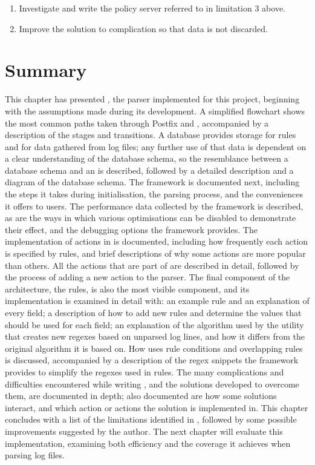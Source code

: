 \begin{enumerate}

    \item Investigate and write the policy server referred to in limitation
        3 above.

    \item Improve the solution to complication  so that data is not discarded.

\end{enumerate}


\section{Summary}

This chapter has presented \parsername{}, the parser implemented for this
project, beginning with the assumptions made during its development.  A
simplified flowchart shows the most common paths taken through Postfix and
\parsername{}, accompanied by a description of the stages and transitions.
A database provides storage for rules and for data gathered from log files;
any further use of that data is dependent on a clear understanding of the
database schema, so the resemblance between a database schema and an
 is described, followed by a detailed description and a
diagram of the database schema.  The framework is documented next,
including the steps it takes during initialisation, the parsing process,
and the conveniences it offers to users.  The performance data collected by
the framework is described, as are the ways in which various optimisations
can be disabled to demonstrate their effect, and the debugging options the
framework provides.  The implementation of actions in \parsername{} is
documented, including how frequently each action is specified by rules, and
brief descriptions of why some actions are more popular than others.  All
the actions that are part of \parsername{} are described in detail,
followed by the process of adding a new action to the parser.  The final
component of the architecture, the rules, is also the most visible
component, and its implementation is examined in detail with: an example
rule and an explanation of every field; a description of how to add new
rules and determine the values that should be used for each field; an
explanation of the algorithm used by the utility that creates new regexes
based on unparsed log lines, and how it differs from the original algorithm
it is based on.  How \parsername{} uses rule conditions and overlapping
rules is discussed, accompanied by a description of the regex snippets the
framework provides to simplify the regexes used in rules.  The many
complications and difficulties encountered while writing \parsername{}, and
the solutions developed to overcome them, are documented in depth; also
documented are how some solutions interact, and which action or actions the
solution is implemented in.  This chapter concludes with a list of the
limitations identified in \parsername{}, followed by some possible
improvements suggested by the author.  The next chapter will evaluate this
implementation, examining both \parsernames{} efficiency and the coverage
it achieves when parsing log files.
